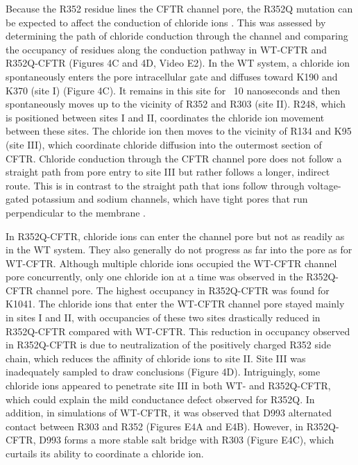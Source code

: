 Because the R352 residue lines the CFTR channel pore, the R352Q mutation can be expected to affect the conduction of chloride ions \cite{zhang2018}. This was assessed by determining the path of chloride conduction through the channel and comparing the occupancy of residues along the conduction pathway in WT-CFTR and R352Q-CFTR (Figures 4C and 4D, Video E2). In the WT system, a chloride ion spontaneously enters the pore intracellular gate \cite{linsdell2018} and diffuses toward K190 and K370 (site I) (Figure 4C). It remains in this site for ~10 nanoseconds and then spontaneously moves up to the vicinity of R352 and R303 (site II). R248, which is positioned between sites I and II, coordinates the chloride ion movement between these sites. The chloride ion then moves to the vicinity of R134 and K95 (site III), which coordinate chloride diffusion into the outermost section of CFTR. Chloride conduction through the CFTR channel pore does not follow a straight path from pore entry to site III but rather follows a longer, indirect route. This is in contrast to the straight path that ions follow through voltage-gated potassium and sodium channels, which have tight pores that run perpendicular to the membrane \cite{flood2019}.

In R352Q-CFTR, chloride ions can enter the channel pore but not as readily as in the WT system. They also generally do not progress as far into the pore as for WT-CFTR. Although multiple chloride ions occupied the WT-CFTR channel pore concurrently, only one chloride ion at a time was observed in the R352Q-CFTR channel pore. The highest occupancy in R352Q-CFTR was found for K1041. The chloride ions that enter the WT-CFTR channel pore stayed mainly in sites I and II, with occupancies of these two sites drastically reduced in R352Q-CFTR compared with WT-CFTR. This reduction in occupancy observed in R352Q-CFTR is due to neutralization of the positively charged R352 side chain, which reduces the affinity of chloride ions to site II. Site III was inadequately sampled to draw conclusions (Figure 4D). Intriguingly, some chloride ions appeared to penetrate site III in both WT- and R352Q-CFTR, which could explain the mild conductance defect observed for R352Q. In addition, in simulations of WT-CFTR, it was observed that D993 alternated contact between R303 and R352 (Figures E4A and E4B). However, in R352Q-CFTR, D993 forms a more stable salt bridge with R303 (Figure E4C), which curtails its ability to coordinate a chloride ion.

